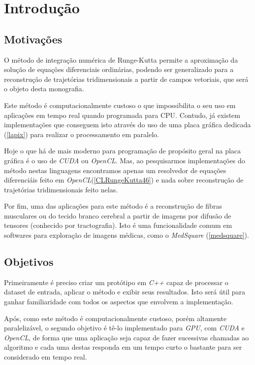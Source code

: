 \chapter{Introdução}

\section{Motivações}
O método de integração numérica de Runge-Kutta permite a aproximação da solução de equações diferenciais ordinárias, podendo ser generalizado para a reconstrução de trajetórias tridimensionais a partir de campos vetoriais, que será o objeto desta monografia.

Este método é computacionalmente custoso o que impossibilita o seu uso em aplicações em tempo real quando programada para CPU. Contudo, já existem implementações que conseguem isto através do uso de uma placa gráfica dedicada (\ref{lapix}) para realizar o processamento em paralelo.

Hoje o que há de mais moderno para programação de propósito geral na placa gráfica é o uso de \textit{CUDA} ou \textit{OpenCL}. Mas, ao pesquisarmos implementações do método nestas linguagens encontramos apenas um resolvedor de equações diferenciáis feito em \textit{OpenCL}(\ref{CLRungeKutta46}) e nada sobre reconstrução de trajetórias tridimensionais feito nelas.

Por fim, uma das aplicações para este método é a reconstrução de fibras musculares ou do tecido branco cerebral a partir de imagens por difusão de tensores (conhecido por tractografia). Isto é uma funcionalidade comum em softwares para exploração de imagens médicas, como o \textit{MedSquare} (\ref{medsquare}).

\section{Objetivos}
Primeiramente é preciso criar um protótipo em \textit{C++} capaz de processar o dataset de entrada, aplicar o método e exibir seus resultados. Isto será útil para ganhar familiaridade com todos os aspectos que envolvem a implementação.

Após, como este método é computacionalmente custoso, porém altamente paralelizável, o segundo objetivo é tê-lo implementado para \textit{GPU}, com \textit{CUDA} e \textit{OpenCL}, de forma que uma aplicação seja capaz de fazer sucessivas chamadas ao algoritmo e cada uma destas responda em um tempo curto o bastante para ser considerado em tempo real.

